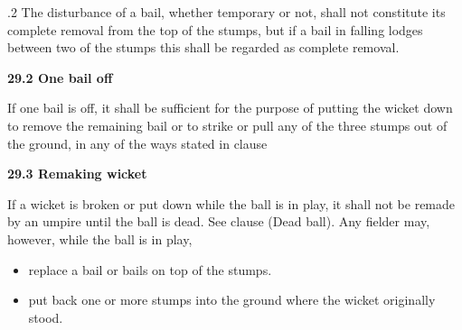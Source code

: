 \documentclass[12pt]{article}
\begin{document}
\vspace{\baselineskip}
\begin{adjustwidth}{0.5in}{0.04in}
{\fontsize{9pt}{10.8pt}.2 \tabto{0.49in} The disturbance of a bail, whether temporary or not, shall not constitute its complete removal from the top of the stumps, but if a bail in falling lodges between two of the stumps this shall be regarded as complete removal.\par}\par

\end{adjustwidth}


\vspace{\baselineskip}
{\fontsize{11pt}{13.2pt}\selectfont \textbf{29.2 \tabto{0.47in} One bail off}\par}\par


\vspace{\baselineskip}
\begin{adjustwidth}{0.0in}{0.29in}
{\fontsize{9pt}{10.8pt}\selectfont If one bail is off, it shall be sufficient for the purpose of putting the wicket down to remove the remaining bail or to strike or pull any of the three stumps out of the ground, in any of the ways stated in clause \par}\par

\end{adjustwidth}


\vspace{\baselineskip}
{\fontsize{11pt}{13.2pt}\selectfont \textbf{29.3 \tabto{0.47in} Remaking wicket}\par}\par


\vspace{\baselineskip}
\begin{adjustwidth}{0.0in}{0.24in}
{\fontsize{9pt}{10.8pt}\selectfont If a wicket is broken or put down while the ball is in play, it shall not be remade by an umpire until the ball is dead. See clause (Dead ball). Any fielder may, however, while the ball is in play,\par}\par

\end{adjustwidth}


\vspace{\baselineskip}
\begin{itemize}
	\item {\fontsize{9pt}{10.8pt}\selectfont replace a bail or bails on top of the stumps.\par}\par


\vspace{\baselineskip}
	\item {\fontsize{9pt}{10.8pt}\selectfont put back one or more stumps into the ground where the wicket originally stood.\par}
\end{itemize}\par
\end{document}
